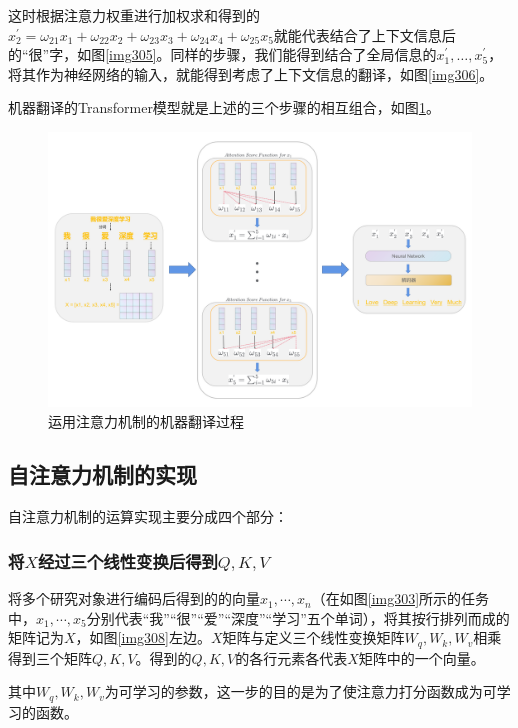 这时根据注意力权重进行加权求和得到的$x_2^{'} = \omega_{21}x_{1}+\omega_{22}x_{2}+\omega_{23}x_{3}+\omega_{24}x_{4}+\omega_{25}x_{5}$就能代表结合了上下文信息后的“很”字，如图\ref{img305}。同样的步骤，我们能得到结合了全局信息的$x_1^{'},…,x_5^{'}$，将其作为神经网络的输入，就能得到考虑了上下文信息的翻译，如图\ref{img306}。

机器翻译的Transformer模型就是上述的三个步骤的相互组合，如图\ref{img307}。

\begin{figure}[h]
	\centering
	\includegraphics[width=0.9\columnwidth]{image/chap03/img307.png}
	\caption{运用注意力机制的机器翻译过程}
	\label{img307}
\end{figure}



\subsection{自注意力机制的实现}

自注意力机制的运算实现主要分成四个部分：

\subsubsection{将$X$经过三个线性变换后得到$Q,K,V$}

将多个研究对象进行编码后得到的的向量$x_1,\cdots ,x_n$（在如图\ref{img303}所示的任务中，$x_1,\cdots ,x_5$分别代表“我”“很”“爱”“深度”“学习”五个单词），将其按行排列而成的矩阵记为$X$，如图\ref{img308}左边。$X$矩阵与定义三个线性变换矩阵$W_q,W_k,W_v$相乘得到三个矩阵$Q,K,V$。得到的$Q,K,V$的各行元素各代表$X$矩阵中的一个向量。

其中$W_q,W_k,W_v$为可学习的参数，这一步的目的是为了使注意力打分函数成为可学习的函数。

